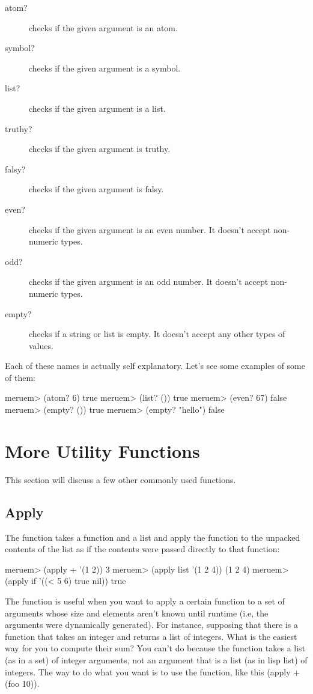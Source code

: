 \begin{description}
	\item[atom?] checks if the given argument is an atom.
	\item[symbol?] checks if the given argument is a symbol.
	\item[list?] checks if the given argument is a list.
	\item[truthy?] checks if the given argument is truthy.
	\item[falsy?] checks if the given argument is falsy.
	\item[even?] checks if the given argument is an even number. It doesn't accept non-numeric types.
	\item[odd?] checks if the given argument is an odd number. It doesn't accept non-numeric types.
	\item[empty?] checks if a string or list is empty. It doesn't accept any other types of values.
\end{description}

Each of these names is actually self explanatory. Let's see some examples of some of them:

\begin{REPL}
meruem> (atom? 6)
true
meruem> (list? ())
true
meruem> (even? 67)
false
meruem> (empty? ())
true
meruem> (empty? "hello")
false
\end{REPL}

\section{More Utility Functions}
This section will discuss a few other commonly used functions.

\subsection{Apply}
The  function takes a function and a list and apply the function to the unpacked contents of the list as if the contents were passed directly to that function:

\begin{REPL}
meruem> (apply + '(1 2))
3
meruem> (apply list '(1 2 4))
(1 2 4)
meruem> (apply if '((< 5 6) true nil))
true
\end{REPL}

The  function is useful when you want to apply a certain function to a set of arguments whose size and elements aren't known until runtime (i.e, the arguments were dynamically generated). For instance, supposing that there is a function  that takes an integer and returns a list of integers. What is the easiest way for you to compute their sum? You can't do  because the \code{+} function takes a list (as in a set) of integer arguments, not an argument that is a list (as in lisp list)  of integers. The way to do what you want is to use the  function, like this (apply + (foo 10)).

